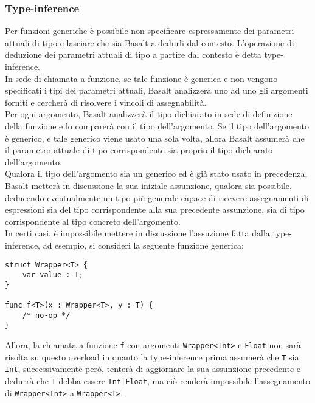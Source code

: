 \subsubsection{Type-inference}
Per funzioni generiche è possibile non specificare espressamente dei parametri 
attuali di tipo e lasciare che sia Basalt a dedurli dal contesto. 
L’operazione di deduzione dei parametri attuali di tipo a partire dal 
contesto è detta type-inference. \\

In sede di chiamata a funzione, se tale funzione è generica e non vengono specificati
i tipi dei parametri attuali, Basalt analizzerà uno ad uno gli argomenti forniti e cercherà 
di risolvere i vincoli di assegnabilità. \\

Per ogni argomento, Basalt analizzerà il tipo dichiarato in sede di definizione della funzione e 
lo comparerà con il tipo dell'argomento. Se il tipo dell'argomento è generico, e tale generico 
viene usato una sola volta, allora Basalt assumerà che il parametro attuale di tipo corrispondente sia 
proprio il tipo dichiarato dell'argomento. \\

Qualora il tipo dell'argomento sia un generico ed è già stato usato in precedenza, Basalt metterà in discussione
la sua iniziale assunzione, qualora sia possibile, deducendo eventualmente un tipo più generale capace di ricevere assegnamenti di 
espressioni sia del tipo corrispondente alla sua precedente assunzione, sia di tipo corrispondente al tipo concreto 
dell'argomento. \\

In certi casi, è impossibile mettere in discussione l'assuzione fatta dalla type-inference, ad esempio, si consideri 
la seguente funzione generica:

\vspace{0.5cm}
\begin{lstlisting}[frame=single]
struct Wrapper<T> {
    var value : T;
}

func f<T>(x : Wrapper<T>, y : T) { 
    /* no-op */ 
}
\end{lstlisting}
\vspace{0.5cm}

Allora, la chiamata a funzione \texttt{f} con argomenti \texttt{Wrapper<Int>} e \texttt{Float} non sarà 
risolta su questo overload in quanto la type-inference prima assumerà che \texttt{T} sia \texttt{Int}, successivamente 
però, tenterà di aggiornare la sua assunzione precedente e dedurrà che \texttt{T} debba essere \texttt{Int|Float},
ma ciò renderà impossibile l'assegnamento di \texttt{Wrapper<Int>} a \texttt{Wrapper<T>}. \\

